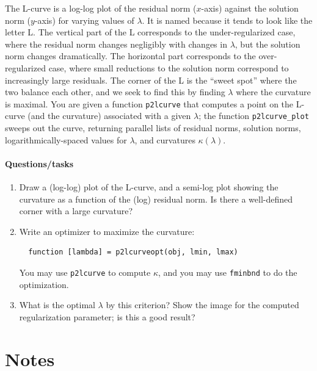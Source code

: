 \documentclass[12pt, leqno]{article} %
\begin{document}
The L-curve is a log-log plot of the residual norm ($x$-axis) against
the solution norm ($y$-axis) for varying values of $\lambda$.  It is
named because it tends to look like the letter L.  The vertical part of the L
corresponds to the under-regularized case, where the residual norm
changes negligibly with changes in $\lambda$, but the solution norm
changes dramatically.  The horizontal part corresponds to the
over-regularized case, where small reductions to the solution norm
correspond to increasingly large residuals.  The corner of the L is
the ``sweet spot'' where the two balance each other, and we seek to
find this by finding $\lambda$ where the curvature is maximal.
You are given a function {\tt p2lcurve} that computes a point on the
L-curve (and the curvature) associated with a given $\lambda$;
the function {\tt p2lcurve\_plot} sweeps out the curve, returning
parallel lists of residual norms, solution norms,
logarithmically-spaced values for $\lambda$, and
curvatures $\kappa(\lambda)$.

\paragraph*{Questions/tasks}
\begin{enumerate}
\item
  Draw a (log-log) plot of the L-curve, and a semi-log plot showing
  the curvature as a function of the (log) residual norm.  Is there
  a well-defined corner with a large curvature?
\item
  Write an optimizer to maximize the curvature:
\begin{lstlisting}
  function [lambda] = p2lcurveopt(obj, lmin, lmax)
\end{lstlisting}
  You may use {\tt p2lcurve} to compute $\kappa$, and you may
  use {\tt fminbnd} to do the optimization.
\item
  What is the optimal $\lambda$ by this criterion?
  Show the image for the computed regularization parameter;
  is this a good result?
\end{enumerate}

\section{Notes}
\end{document}
